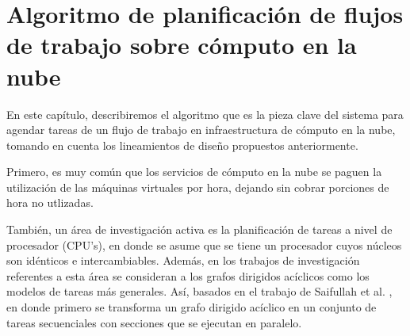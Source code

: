 \chapter{Algoritmo de planificación de flujos de trabajo sobre cómputo en la nube}

En este capítulo, describiremos el algoritmo que es la pieza clave del sistema para agendar tareas de un flujo de trabajo en infraestructura de cómputo en la nube, tomando en cuenta los lineamientos de diseño propuestos anteriormente.

Primero, es muy común que los servicios de cómputo en la nube se paguen la utilización de las máquinas virtuales por hora, dejando sin cobrar porciones de hora no utlizadas.

También, un área de investigación activa es la planificación de tareas a nivel de procesador (CPU's), en donde se asume que se tiene un procesador cuyos núcleos son idénticos e intercambiables. Además, en los trabajos de investigación referentes a esta área se consideran a los grafos dirigidos acíclicos como los modelos de tareas más generales. Así, basados en el trabajo de Saifullah et al. \cite{saifullah2013multi}, en donde primero se transforma un grafo dirigido acíclico en un conjunto de tareas secuenciales con secciones que se ejecutan en paralelo.

